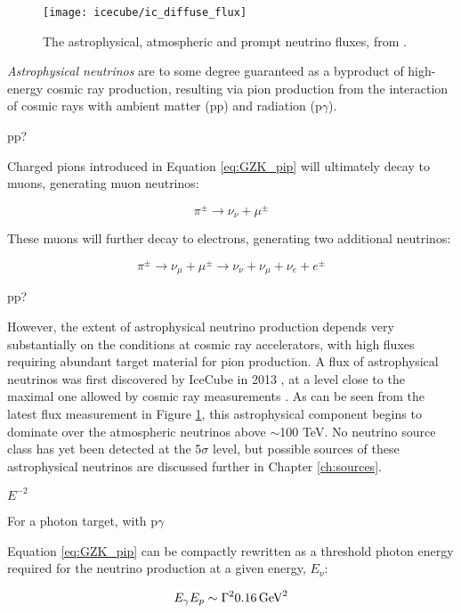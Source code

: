 \begin{figure}
	\centering \texttt{[image: icecube/ic\_diffuse\_flux]}
	\caption{The astrophysical, atmospheric and prompt neutrino fluxes, from \cite{ic_15_joint}.}
	\label{fig:ic_diffuse_flux}
\end{figure}

\emph{Astrophysical neutrinos} are to some degree guaranteed as a byproduct of high-energy cosmic ray production, resulting via pion production from the interaction of cosmic rays with ambient matter (pp) and radiation (p$\gamma$). 

pp?

Charged pions introduced in Equation \ref{eq:GZK_pip} will ultimately decay to muons, generating muon neutrinos:

\begin{equation}
	\pi^{\pm} \rightarrow \nu_{\nu} + \mu^{\pm}
\end{equation}

These muons will further decay to electrons, generating two additional neutrinos:

\begin{equation}
	\pi^{\pm} \rightarrow \nu_{\mu} + \mu^{\pm} \rightarrow \nu_{\nu} + \nu_{\mu} + \nu_{e} + e^{\pm}
\end{equation}

pp?

However, the extent of astrophysical neutrino production depends very substantially on the conditions at cosmic ray accelerators, with high fluxes requiring abundant target material for pion production. A flux of astrophysical neutrinos was first discovered by IceCube in 2013 , at a level close to the maximal one allowed by cosmic ray measurements . As can be seen from the latest flux measurement in Figure \ref{fig:ic_diffuse_flux}, this astrophysical component begins to dominate over the atmospheric neutrinos above $\sim$100 TeV. No neutrino source class has yet been detected at the 5$\sigma$ level, but possible sources of these astrophysical neutrinos are discussed further in Chapter \ref{ch:sources}.

$E^{-2}$

For a photon target, with p$\gamma$ 

Equation \ref{eq:GZK_pip} can be compactly rewritten as a threshold photon energy required for the neutrino production at a given energy, $E_{\nu}$:

\begin{equation}
	E_{\gamma}E_{p} \sim \Gamma ^{2} 0.16 \,  \textup{GeV}^{2}
	\label{eq:delta_res}
\end{equation} 

